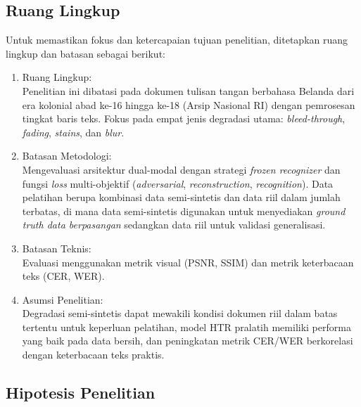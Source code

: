 \documentclass[12pt,a4paper]{article}
\begin{document}
\subsection{Ruang Lingkup}
\label{subsec:ruang-lingkup}

Untuk memastikan fokus dan ketercapaian tujuan penelitian, ditetapkan ruang lingkup dan batasan sebagai berikut:

\begin{enumerate}[label=\arabic*., leftmargin=0.5cm]
    \item Ruang Lingkup: \\
    Penelitian ini dibatasi pada dokumen tulisan tangan berbahasa Belanda dari era kolonial abad ke-16 hingga ke-18 (Arsip Nasional RI) dengan pemrosesan tingkat baris teks. Fokus pada empat jenis degradasi utama: \textit{bleed-through}, \textit{fading}, \textit{stains}, dan \textit{blur}.


    \item Batasan Metodologi: \\
    Mengevaluasi arsitektur dual-modal dengan strategi \textit{frozen recognizer} dan fungsi \textit{loss} multi-objektif (\textit{adversarial}, \textit{reconstruction}, \textit{recognition}). Data pelatihan berupa kombinasi data semi-sintetis dan data riil dalam jumlah terbatas, di mana data semi-sintetis digunakan untuk menyediakan \textit{ground truth data berpasangan} sedangkan data riil untuk validasi generalisasi.


    \item Batasan Teknis: \\
    Evaluasi menggunakan metrik visual (PSNR, SSIM) dan metrik keterbacaan teks (CER, WER).


    \item Asumsi Penelitian: \\
    Degradasi semi-sintetis dapat mewakili kondisi dokumen riil dalam batas tertentu untuk keperluan pelatihan, model HTR pralatih memiliki performa yang baik pada data bersih, dan peningkatan metrik CER/WER berkorelasi dengan keterbacaan teks praktis.
\end{enumerate}

\vspace{0.8em}
\subsection{Hipotesis Penelitian}
\label{subsec:hipotesis}
\end{document}
